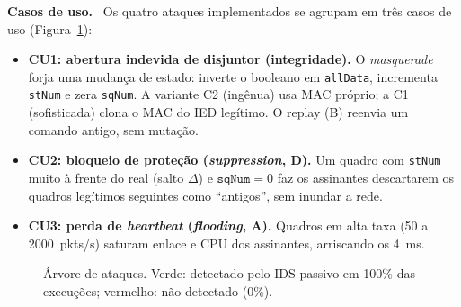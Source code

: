 \documentclass[12pt]{article}
\renewcommand{\paragraph}[1]{\par\noindent\textbf{#1}\ }
\begin{document}
\paragraph{Casos de uso.} Os quatro ataques implementados se agrupam em tr\^es casos de uso (Figura~\ref{fig:arvore}):
\begin{itemize}
  \item \textbf{CU1: abertura indevida de disjuntor (integridade).} O \emph{masquerade} forja uma mudan\c{c}a de estado: inverte o booleano em \texttt{allData}, incrementa \texttt{stNum} e zera \texttt{sqNum}. A variante C2 (ing\^enua) usa MAC pr\'oprio; a C1 (sofisticada) clona o MAC do IED leg\'itimo. O replay (B) reenvia um comando antigo, sem muta\c{c}\~ao.
  \item \textbf{CU2: bloqueio de prote\c{c}\~ao (\emph{suppression}, D).} Um quadro com \texttt{stNum} muito \`a frente do real (salto $\Delta$) e $\texttt{sqNum}=0$ faz os assinantes descartarem os quadros leg\'itimos seguintes como ``antigos'', sem inundar a rede.
  \item \textbf{CU3: perda de \emph{heartbeat} (\emph{flooding}, A).} Quadros em alta taxa (50 a 2000~pkts/s) saturam enlace e CPU dos assinantes, arriscando os 4~ms.
\end{itemize}

\begin{figure}[!htb]
\centering
{}
\caption{\'Arvore de ataques. Verde: detectado pelo IDS passivo em 100\% das execu\c{c}\~oes; vermelho: n\~ao detectado (0\%).}\label{fig:arvore}
\end{figure}
\end{document}
